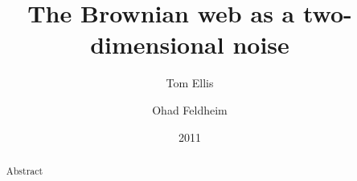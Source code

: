 {
\title{The Brownian web as a two-dimensional noise}

\author{Tom Ellis\\%
\and Ohad Feldheim}

\date{2011}

\maketitle

\begin{abstract}
Abstract
\end{abstract}

}
